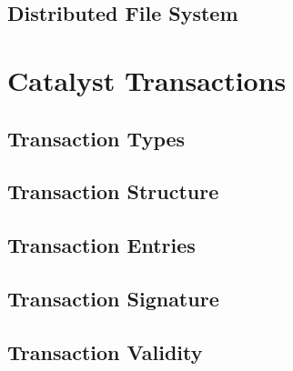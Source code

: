\documentclass[a4paper, 12pt]{book}
\begin{document}


\section{Distributed File System}\label{SecDFS}




\chapter{Catalyst Transactions} \label{Cha:Tra}




\section{Transaction Types} \label{Sec:Typ}



\section{Transaction Structure} \label{Sec:TStru}




\section{Transaction Entries}\label{Sec:TEnt}



\section{Transaction Signature}\label{Sec:Sig}




\section{Transaction Validity} \label{Sec:Val}



\end{document}
